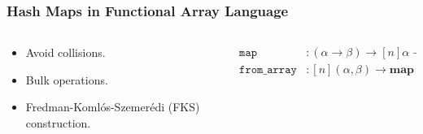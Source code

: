 \documentclass[aspectratio=169]{beamer}
\newcommand{\kw}[1]{\ensuremath{\mathtt{#1}}}
\newcommand{\Map}{\kw{map}}
\begin{document}
\begin{frame}\frametitle{Hash Maps in Functional Array Language}
  \begin{columns}
  \begin{column}{.38\textwidth}
  \hfill
  \begin{itemize}
    \item Avoid collisions.
    \item Bulk operations.
    \item<2-> Fredman-Komlós-Szemerédi (FKS) construction. 
  \end{itemize}
  \hfill  
  \end{column}
  \hfill
  \begin{column}{.6\textwidth}
    \begin{align*}
      \Map & : (\alpha \to \beta) \to [n]\alpha \to [n]\beta \\
      \mathtt{from\_array} & : [n](\alpha, \beta) \to \mathbf{map} ~ \alpha ~ \beta
    \end{align*} 
  \end{column}
  \end{columns}
\end{frame}
\end{document}
